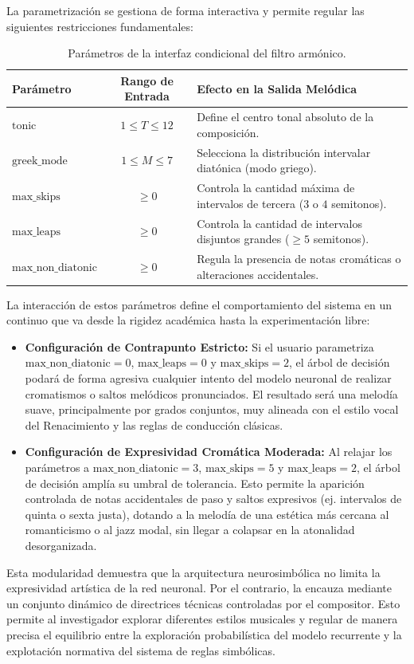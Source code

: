 La parametrización se gestiona de forma interactiva y permite regular las siguientes restricciones fundamentales:
\begin{table}[H]
    \centering
    \begin{tabular}{|l|c|l|}
        \hline
        \textbf{Parámetro} & \textbf{Rango de Entrada} & \textbf{Efecto en la Salida Melódica} \\ \hline
        $\text{tonic}$ & $1 \le T \le 12$ & Define el centro tonal absoluto de la composición. \\ \hline
        $\text{greek\_mode}$ & $1 \le M \le 7$ & Selecciona la distribución intervalar diatónica (modo griego). \\ \hline
        $\text{max\_skips}$ & $\ge 0$ & Controla la cantidad máxima de intervalos de tercera ($3$ o $4$ semitonos). \\ \hline
        $\text{max\_leaps}$ & $\ge 0$ & Controla la cantidad de intervalos disjuntos grandes ($\ge 5$ semitonos). \\ \hline
        $\text{max\_non\_diatonic}$ & $\ge 0$ & Regula la presencia de notas cromáticas o alteraciones accidentales. \\ \hline
    \end{tabular}
    \caption{Parámetros de la interfaz condicional del filtro armónico.}
\end{table}

La interacción de estos parámetros define el comportamiento del sistema en un continuo que va desde la rigidez académica hasta la experimentación libre:
\begin{itemize}
    \item \textbf{Configuración de Contrapunto Estricto:} Si el usuario parametriza $\text{max\_non\_diatonic} = 0$, $\text{max\_leaps} = 0$ y $\text{max\_skips} = 2$, el árbol de decisión podará de forma agresiva cualquier intento del modelo neuronal de realizar cromatismos o saltos melódicos pronunciados. El resultado será una melodía suave, principalmente por grados conjuntos, muy alineada con el estilo vocal del Renacimiento y las reglas de conducción clásicas.
    
    \item \textbf{Configuración de Expresividad Cromática Moderada:} Al relajar los parámetros a $\text{max\_non\_diatonic} = 3$, $\text{max\_skips} = 5$ y $\text{max\_leaps} = 2$, el árbol de decisión amplía su umbral de tolerancia. Esto permite la aparición controlada de notas accidentales de paso y saltos expresivos (ej. intervalos de quinta o sexta justa), dotando a la melodía de una estética más cercana al romanticismo o al jazz modal, sin llegar a colapsar en la atonalidad desorganizada.
\end{itemize}

Esta modularidad demuestra que la arquitectura neurosimbólica no limita la expresividad artística de la red neuronal. Por el contrario, la encauza mediante un conjunto dinámico de directrices técnicas controladas por el compositor. Esto permite al investigador explorar diferentes estilos musicales y regular de manera precisa el equilibrio entre la exploración probabilística del modelo recurrente y la explotación normativa del sistema de reglas simbólicas.
